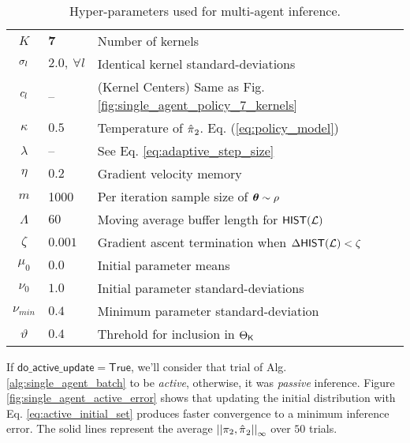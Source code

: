 \begin{table}[htb]
	\centering
	\begin{tabular}{c|l l}
		$K$ & $\mathbf{7}$ & Number of kernels\\
		$\sigma_{l}$ & $2.0,\ \forall l$ & Identical kernel standard-deviations\\
		$c_{l}$ & -- & (Kernel Centers) Same as Fig. \ref{fig:single_agent_policy_7_kernels}\\
		$\kappa$ & $0.5$ & Temperature of $\hat{\pi_{}}_2$. Eq. (\ref{eq:policy_model}) \\
		$\lambda$ & -- & See Eq. \ref{eq:adaptive_step_size} \\
		$\eta$ & $0.2$ & Gradient velocity memory\\
		$m$ & 1000 & Per iteration sample size of $\boldsymbol{\mathbb{\theta}}\sim \rho$\\
		$\Lambda$ & $60$ & Moving average buffer length for $\mathsf{HIST}(\mathcal{L})$ \\
		$\zeta$ & $0.001$ & Gradient ascent termination when $\Delta\mathsf{HIST}(\mathcal{L}) < \zeta$\\
		$\mu_{0}$ & $0.0$ & Initial parameter means\\
		$\nu_{0}$ & $1.0$ & Initial parameter standard-deviations\\
		$\nu_{min}$ & $0.4$ & Minimum parameter standard-deviation\\
		$\vartheta$ & $0.4$ & Threhold for inclusion in $\Theta_{\mathsf{K}}$\\
	\end{tabular}
	\caption{Hyper-parameters used for multi-agent inference.}
	\label{table:single_agent_active_hyper_params}
\end{table}

If $\mathsf{do\_active\_update}=\mathsf{True}$, we'll consider that trial of Alg. \ref{alg:single_agent_batch} to be \emph{active}, otherwise, it was \emph{passive} inference. Figure \ref{fig:single_agent_active_error} shows that updating the initial distribution with Eq. \ref{eq:active_initial_set} produces faster convergence to a minimum inference error. The solid lines represent the average $\left|\left|\pi_{2},\hat{\pi_{}}_2\right|\right|_{\infty}$ over $50$ trials.



\begin{figure}[!htb]
	\begin{center}
	\end{center}
\end{figure}

